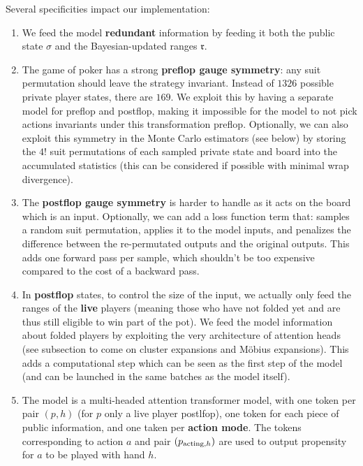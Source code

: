 \documentclass[12pt, a4paper]{article}
\begin{document}
Several specificities impact our implementation:
\begin{enumerate}
  \item We feed the model \textbf{redundant} information by feeding it both the public state $\sigma$ and the Bayesian-updated ranges $\mathfrak{r}$.
  
  \item The game of poker has a strong \textbf{preflop gauge symmetry}: any suit permutation should leave the strategy invariant.
  Instead of $1326$ possible private player states, there are $169$.
  We exploit this by having a separate model for preflop and postflop, making it impossible for the model to not pick actions invariants under this transformation preflop.
  Optionally, we can also exploit this symmetry in the Monte Carlo estimators (see below) by storing the $4!$ suit permutations of each sampled private state and board into the accumulated statistics (this can be considered if possible with minimal wrap divergence).
  
  \item The \textbf{postflop gauge symmetry} is harder to handle as it acts on the board which is an input.
  Optionally, we can add a loss function term that: samples a random suit permutation, applies it to the model inputs, and penalizes the difference between the re-permutated outputs and the original outputs.
  This adds one forward pass per sample, which shouldn't be too expensive compared to the cost of a backward pass. 
  
  \item In \textbf{postflop} states, to control the size of the input, we actually only feed the ranges of the \textbf{live} players (meaning those who have not folded yet and are thus still eligible to win part of the pot).
  We feed the model information about folded players by exploiting the very architecture of attention heads (see subsection to come on cluster expansions and Möbius expansions).
  This adds a computational step which can be seen as the first step of the model (and can be launched in the same batches as the model itself).

  \item The model is a multi-headed attention transformer model, with one token per pair $(p,h)$ (for $p$ only a live player postlfop), one token for each piece of public information, and one taken per \textbf{action mode}.
  The tokens corresponding to action $a$ and pair $(p_{\textnormal{acting}, h})$ are used to output propensity for $a$ to be played with hand $h$.


\end{enumerate}
\end{document}
